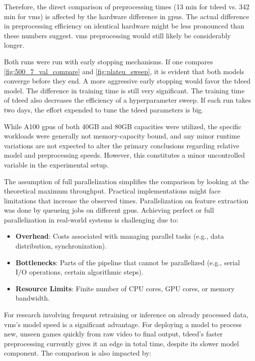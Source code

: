 Therefore, the direct comparison of preprocessing times (13 min for \acrshort{tdeed} vs. 342 min for \acrshort{vms}) is affected by the hardware difference in \acrshort{gpu}s. The actual difference in preprocessing efficiency on identical hardware might be less pronounced than these numbers suggest. \acrshort{vms} preprocessing would still likely be considerably longer. 


Both runs were run with early stopping mechanisms. If one compares \cref{fig:500_7_val_compare} and \cref{fig:plateu_sweep}, it is evident that both models converge before they end. A more aggressive early stopping would favor the \acrshort{tdeed} model. The difference in training time is still very significant. The training time of \acrshort{tdeed} also decreases the efficiency of a hyperparameter sweep. If each run takes two days, the effort expended to tune the \acrshort{tdeed} parameters is big. 


While A100 \acrshort{gpu}s of both 40GB and 80GB capacities were utilized, the specific workloads were generally not memory-capacity bound, and any minor runtime variations are not expected to alter the primary conclusions regarding relative model and preprocessing speeds. However, this constitutes a minor uncontrolled variable in the experimental setup. 


The assumption of full parallelization simplifies the comparison by looking at the theoretical maximum throughput. Practical implementations might face limitations that increase the observed times. Parallelization on feature extraction was done by queueing jobs on different \acrshort{gpu}s. Achieving perfect or full parallelization in real-world systems is challenging due to:
\begin{itemize}
    \item \textbf{Overhead}: Costs associated with managing parallel tasks (e.g., data distribution, synchronization).
    \item \textbf{Bottlenecks}: Parts of the pipeline that cannot be parallelized (e.g., serial I/O operations, certain algorithmic steps).
    \item \textbf{Resource Limits}: Finite number of CPU cores, GPU cores, or memory bandwidth.
\end{itemize}


For research involving frequent retraining or inference on already processed data, \acrshort{vms}'s model speed is a significant advantage. For deploying a model to process new, unseen games quickly from raw video to final output, \acrshort{tdeed}'s faster preprocessing currently gives it an edge in total time, despite its slower model component. The comparison is also impacted by:

